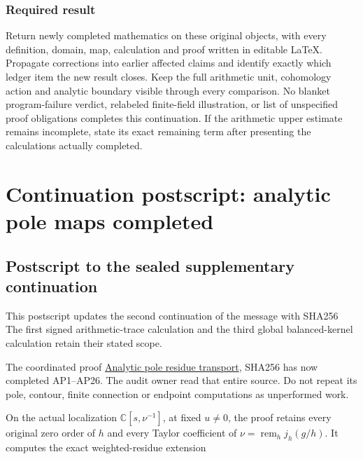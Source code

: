 \documentclass[10pt,a4paper,oneside]{report}
\begin{document}
\subsection{Required result}\label{required-result}

Return newly completed mathematics on these original objects, with every
definition, domain, map, calculation and proof written in editable
LaTeX. Propagate corrections into earlier affected claims and identify
exactly which ledger item the new result closes. Keep the full
arithmetic unit, cohomology action and analytic boundary visible through
every comparison. No blanket program-failure verdict, relabeled
finite-field illustration, or list of unspecified proof obligations
completes this continuation. If the arithmetic upper estimate remains
incomplete, state its exact remaining term after presenting the
calculations actually completed.

\clearpage

\chapter{Continuation postscript: analytic pole maps
completed}\label{continuation-postscript-analytic-pole-maps-completed}

\section{Postscript to the sealed supplementary
continuation}\label{postscript-to-the-sealed-supplementary-continuation}

This postscript updates the second continuation of the message with
SHA256
\protect{}
The first signed arithmetic-trace calculation and the third global
balanced-kernel calculation retain their stated scope.

The coordinated proof
\href{dependencies/remote/f1_unit_gauge/ANALYTIC_POLE_RESIDUE_TRANSPORT.md}{Analytic
pole residue transport}, SHA256
\protect{}
has now completed AP1--AP26. The audit owner read that entire source. Do
not repeat its pole, contour, finite connection or endpoint computations
as unperformed work.

On the actual localization \(\mathbb C[s,\nu^{-1}]\), at fixed
\(u\ne0\), the proof retains every original zero order of \(h\) and
every Taylor coefficient of \(\nu=\operatorname{rem}_h j_h(g/h)\). It
computes the exact weighted-residue extension
\end{document}
